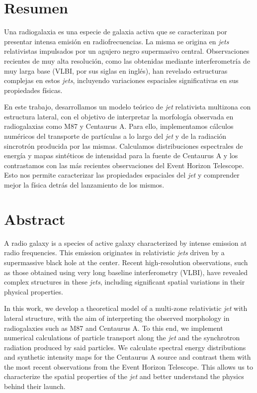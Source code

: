\chapter{Resumen}\label{cha:resumen}

	Una radiogalaxia es una especie de galaxia activa que se caracterizan por presentar intensa emisi\'on en radiofrecuencias. La misma se origina en \textit{jets} relativistas impulsados por un agujero negro supermasivo central. 
	Observaciones recientes de muy alta resoluci\'on, como las obtenidas mediante interferometr\'ia de muy larga base (VLBI, por sus siglas en ingl\'es), han revelado estructuras complejas en estos \textit{jets}, incluyendo variaciones espaciales significativas en sus propiedades f\'isicas.

	En este trabajo, desarrollamos un modelo teórico de \textit{jet} relativista multizona con estructura lateral, con el objetivo de interpretar la morfología observada en radiogalaxias como M87 y Centaurus A. 
	Para ello, implementamos c\'alculos num\'ericos del transporte de part\'iculas a lo largo del \textit{jet} y de la radiaci\'on sincrotr\'on producida por las mismas. 
	Calculamos distribuciones espectrales de energía y mapas sintéticos de intensidad para la fuente de Centaurus A y los contrastamos con las más recientes observaciones del Event Horizon Telescope. 
	Esto nos permite caracterizar las propiedades espaciales del \textit{jet} y comprender mejor la f\'isica detr\'as del lanzamiento de los mismos.





\newpage

\chapter{Abstract}\label{cha:abstract}

	A radio galaxy is a species of active galaxy characterized by intense emission at radio frequencies. This emission originates in relativistic \textit{jets} driven by a supermassive black hole at the center. 
	Recent high-resolution observations, such as those obtained using very long baseline interferometry (VLBI), have revealed complex structures in these \textit{jets}, including significant spatial variations in their physical properties. 
	
	In this work, we develop a theoretical model of a multi-zone relativistic \textit{jet} with lateral structure, with the aim of interpreting the observed morphology in radiogalaxies such as M87 and Centaurus A. 
	To this end, we implement numerical calculations of particle transport along the \textit{jet} and the synchrotron radiation produced by said particles. We calculate spectral energy distributions and synthetic intensity maps for the Centaurus A source and contrast {them} with the most recent observations from the Event Horizon Telescope. 
	This allows us to characterize the spatial properties of the \textit{jet} and better understand the physics behind their launch.

\endinput
